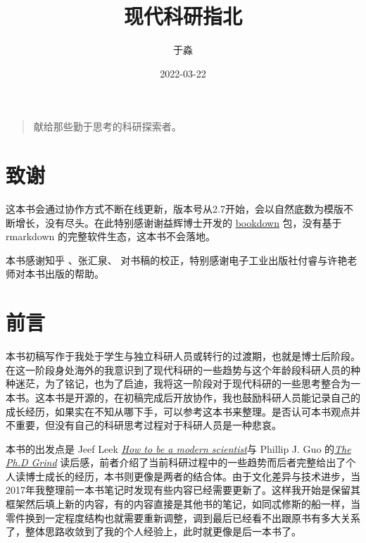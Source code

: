\documentclass[]{tufte-book}
\title{现代科研指北}
\author{于淼}
\date{2022-03-22}
\begin{document}
\maketitle



{
\setcounter{tocdepth}{1}
\tableofcontents
}

\begin{quote}
献给那些勤于思考的科研探索者。
\end{quote}

\hypertarget{ux81f4ux8c22}{%
\chapter*{致谢}\label{ux81f4ux8c22}}

这本书会通过协作方式不断在线更新，版本号从2.7开始，会以自然底数为模版不断增长，没有尽头。在此特别感谢谢益辉博士开发的 \href{https://bookdown.org/yihui/bookdown/}{bookdown} 包，没有基于 rmarkdown 的完整软件生态，这本书不会落地。

本书感谢知乎 \citet{羲洁}、张汇泉、 \citet{wogong} 对书稿的校正，特别感谢电子工业出版社付睿与许艳老师对本书出版的帮助。

\hypertarget{intro}{%
\chapter{前言}\label{intro}}

本书初稿写作于我处于学生与独立科研人员或转行的过渡期，也就是博士后阶段。在这一阶段身处海外的我意识到了现代科研的一些趋势与这个年龄段科研人员的种种迷茫，为了铭记，也为了启迪，我将这一阶段对于现代科研的一些思考整合为一本书。这本书是开源的，在初稿完成后开放协作，我也鼓励科研人员能记录自己的成长经历，如果实在不知从哪下手，可以参考这本书来整理。是否认可本书观点并不重要，但没有自己的科研思考过程对于科研人员是一种悲哀。

本书的出发点是 Jeef Leek \href{https://leanpub.com/modernscientist}{\emph{How to be a modern scientist}}与 Phillip J. Guo 的\href{https://www.goodreads.com/en/book/show/15731248-the-ph-d-grind}{\emph{The Ph.D Grind}} 读后感，前者介绍了当前科研过程中的一些趋势而后者完整给出了个人读博士成长的经历，本书则更像是两者的结合体。由于文化差异与技术进步，当2017年我整理前一本书笔记时发现有些内容已经需要更新了。这样我开始是保留其框架然后填上新的内容，有的内容直接是其他书的笔记，如同忒修斯的船一样，当零件换到一定程度结构也就需要重新调整，调到最后已经看不出跟原书有多大关系了，整体思路收敛到了我的个人经验上，此时就更像是后一本书了。
\end{document}
